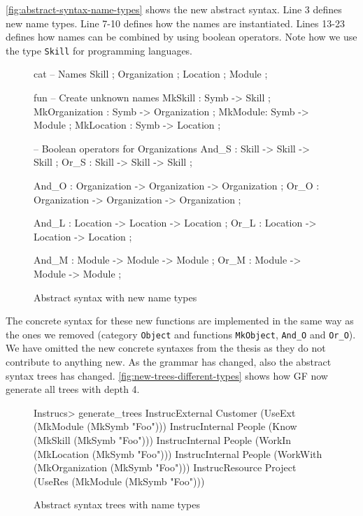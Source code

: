 \autoref{fig:abstract-syntax-name-types} shows the new abstract syntax. Line 3 defines new name types. Line 7-10 defines how the names are instantiated. Lines 13-23 defines how names can be combined by using boolean operators. Note how we use the type \texttt{Skill} for programming languages.

\begin{figure}[H]
\begin{code}
cat
  -- Names
  Skill ; Organization ; Location ; Module ;
  
fun
  -- Create unknown names
  MkSkill : Symb -> Skill ;
  MkOrganization : Symb -> Organization ;
  MkModule: Symb -> Module ;
  MkLocation : Symb -> Location ;
  
  -- Boolean operators for Organizations
  And_S : Skill -> Skill -> Skill ;
  Or_S : Skill -> Skill -> Skill ;

  And_O : Organization -> Organization -> Organization ;
  Or_O : Organization -> Organization -> Organization ;

  And_L : Location -> Location -> Location ;
  Or_L : Location -> Location -> Location ;

  And_M : Module -> Module -> Module ;
  Or_M : Module -> Module -> Module ;
\end{code}
\caption{Abstract syntax with new name types\label{fig:abstract-syntax-name-types}}
\end{figure}

The concrete syntax for these new functions are implemented in the same way as the ones we removed (category \texttt{Object} and functions \texttt{MkObject}, \texttt{And\_O} and \texttt{Or\_O}). We have omitted the new concrete syntaxes from the thesis as they do not contribute to anything new.
\newline
\newline
As the grammar has changed, also the abstract syntax trees has changed. \autoref{fig:new-trees-different-types} shows how GF now generate all trees with depth 4.
\begin{figure}[H]
\begin{terminal}
Instrucs> generate_trees
InstrucExternal Customer (UseExt (MkModule (MkSymb "Foo")))
InstrucInternal People (Know (MkSkill (MkSymb "Foo")))
InstrucInternal People (WorkIn (MkLocation (MkSymb "Foo")))
InstrucInternal People (WorkWith (MkOrganization (MkSymb "Foo")))
InstrucResource Project (UseRes (MkModule (MkSymb "Foo")))

\end{terminal}
\caption{Abstract syntax trees with name types\label{fig:new-trees-different-types}}
\end{figure}


